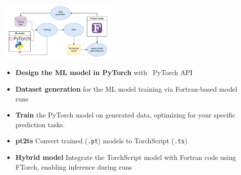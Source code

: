 \begin{tikzfigure}
    \includegraphics[width=0.44\textwidth]{figures/offline-training-diagram.pdf}
\end{tikzfigure}
\begin{itemize}
    \item \textbf{Design the ML model in PyTorch} with \faPython~PyTorch API
    
    \item \textbf{Dataset generation} for the ML model training via Fortran-based model runs
    
    \item \textbf{Train} the PyTorch model on generated data, optimizing for your specific prediction tasks.
    
    \item \textbf{pt2ts} 
        Convert trained (\texttt{.pt}) models to TorchScript (\texttt{.ts})
    
    \item \textbf{Hybrid model} 
        Integrate the TorchScript model with Fortran code using FTorch, enabling inference during runs
\end{itemize}
